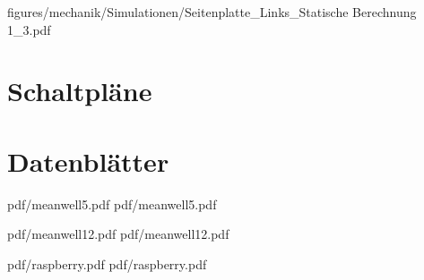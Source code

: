 {figures/mechanik/Simulationen/Seitenplatte_Links_Statische Berechnung 1_3.pdf}



\chapter{Schaltpläne}

\chapter{Datenblätter}

 {pdf/meanwell5.pdf}
 {pdf/meanwell5.pdf}


 {pdf/meanwell12.pdf}
 {pdf/meanwell12.pdf}

 {pdf/raspberry.pdf}
 {pdf/raspberry.pdf}